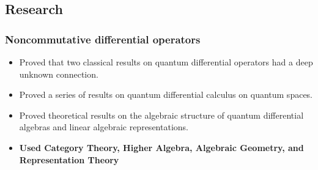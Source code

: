 \documentclass[a4paper,10pt,notitlepage]{article}
\begin{document}
\subsection*{Research}

\subsubsection*{Noncommutative differential operators}
	\begin{itemize}
	\vspace{-5pt}\item 	Proved that two classical results on quantum differential operators had a deep unknown connection.
	\vspace{-5pt}\item 	Proved a series of results on quantum differential calculus on quantum spaces.
	\vspace{-5pt}\item 	Proved theoretical results on the algebraic structure of quantum differential algebras and linear algebraic representations.
	\vspace{-5pt}\item 	\textbf{Used Category Theory, Higher Algebra, Algebraic Geometry, and Representation Theory}
	\end{itemize}
\end{document}
